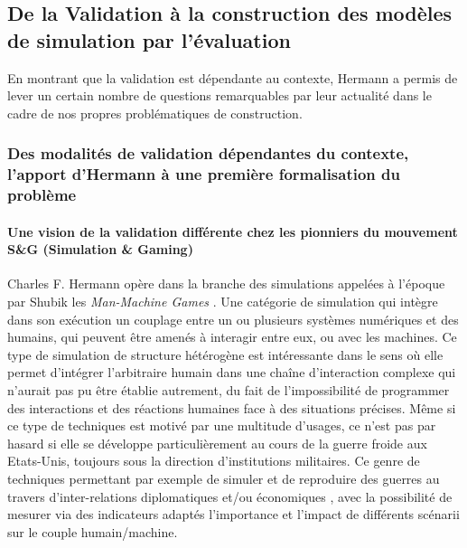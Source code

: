 
\subsection{De la Validation à la construction des modèles de simulation par l'évaluation}
\label{ssec:evaluation_construction}


En montrant que la validation est dépendante au contexte, Hermann a permis de lever un certain nombre de questions remarquables par leur actualité dans le cadre de nos propres problématiques de construction.  %

\subsubsection{Des modalités de validation dépendantes du contexte, l'apport d'Hermann à une première formalisation du problème}
\label{sssec:hermann_contexte}

\paragraph{Une vision de la validation différente chez les pionniers du mouvement S\&G (Simulation \& Gaming)}

Charles F. Hermann opère dans la branche des simulations appelées à l'époque par Shubik les \textit{Man-Machine Games} \autocite{Shubik1972}. Une catégorie de simulation qui intègre dans son exécution un couplage entre un ou plusieurs systèmes numériques et des humains, qui peuvent être amenés à interagir entre eux, ou avec les machines. Ce type de simulation de structure hétérogène est intéressante dans le sens où elle permet d'intégrer l'arbitraire humain dans une chaîne d'interaction complexe qui n'aurait pas pu être établie autrement, du fait de l'impossibilité de programmer des interactions et des réactions humaines face à des situations précises. Même si ce type de techniques est motivé par une multitude d'usages, ce n'est pas par hasard si elle se développe particulièrement au cours de la guerre froide aux Etats-Unis, toujours sous la direction d'institutions militaires. Ce genre de techniques permettant par exemple de simuler et de reproduire des guerres au travers d'inter-relations diplomatiques et/ou économiques \autocite{Hermann1967b}, avec la possibilité de mesurer via des indicateurs adaptés l'importance et l'impact de différents scénarii sur le couple humain/machine.

